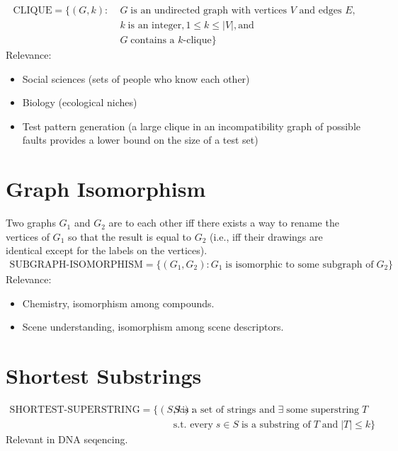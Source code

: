 \documentclass[a4paper]{report}
\theoremstyle{definition}
\begin{document}
\begin{center}
% 

\end{center}
%
\begin{align*}
\text{CLIQUE} = \{ (G, k) : &\; G \; \text{is an undirected graph with vertices $V$ and edges $E$,}\\ & \; k \;\text{is an integer}, 1 \leq k \leq |V|, \text{and}\\ & \; G \; \text{contains a $k$-clique}\}
\end{align*}
%
Relevance:
\begin{itemize}
\item Social sciences (sets of people who know each other)
\item Biology (ecological niches)
\item Test pattern generation (a large clique in an incompatibility graph of possible faults provides a lower bound on the size of a test set)
\end{itemize}

\section{Graph Isomorphism}
Two graphs $G_1$ and $G_2$ are  to each other iff there exists a way to rename the vertices of $G_1$ so that the result is equal to $G_2$ (i.e., iff their drawings are identical except for the labels on the vertices).
%
\begin{align*}
\text{SUBGRAPH-ISOMORPHISM} = \{ (G_1, G_2) : G_1 \;\text{is isomorphic to some subgraph of} \; G_2\}
\end{align*}
%
Relevance:
\begin{itemize}
\item Chemistry, isomorphism among compounds.
\item Scene understanding, isomorphism among scene descriptors.
\end{itemize}

\section{Shortest Substrings}
\vspace{-0.3cm}%
\begin{align*}
\text{SHORTEST-SUPERSTRING} = \{ (S, k) : & \;S \;\text{is a set of strings and} \; \exists \;\text{some superstring} \; T \\ & \;\text{s.t.~every} \;s \in S \;\text{is a substring of} \; T \; \text{and} \; |T| \leq k\}
\end{align*}
%
Relevant in DNA seqencing.
\end{document}
